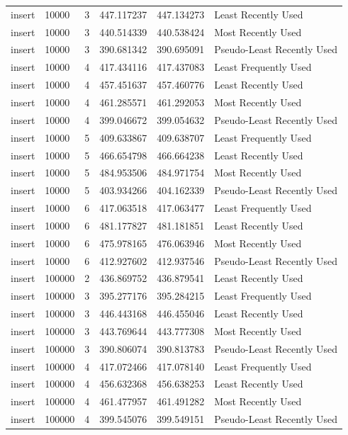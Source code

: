 \begin{tabular}{llrrrl}
insert & 10000 & 3 & 447.117237 & 447.134273 & Least Recently Used \\
insert & 10000 & 3 & 440.514339 & 440.538424 & Most Recently Used \\
insert & 10000 & 3 & 390.681342 & 390.695091 & Pseudo-Least Recently Used \\
insert & 10000 & 4 & 417.434116 & 417.437083 & Least Frequently Used \\
insert & 10000 & 4 & 457.451637 & 457.460776 & Least Recently Used \\
insert & 10000 & 4 & 461.285571 & 461.292053 & Most Recently Used \\
insert & 10000 & 4 & 399.046672 & 399.054632 & Pseudo-Least Recently Used \\
insert & 10000 & 5 & 409.633867 & 409.638707 & Least Frequently Used \\
insert & 10000 & 5 & 466.654798 & 466.664238 & Least Recently Used \\
insert & 10000 & 5 & 484.953506 & 484.971754 & Most Recently Used \\
insert & 10000 & 5 & 403.934266 & 404.162339 & Pseudo-Least Recently Used \\
insert & 10000 & 6 & 417.063518 & 417.063477 & Least Frequently Used \\
insert & 10000 & 6 & 481.177827 & 481.181851 & Least Recently Used \\
insert & 10000 & 6 & 475.978165 & 476.063946 & Most Recently Used \\
insert & 10000 & 6 & 412.927602 & 412.937546 & Pseudo-Least Recently Used \\
insert & 100000 & 2 & 436.869752 & 436.879541 & Least Recently Used \\
insert & 100000 & 3 & 395.277176 & 395.284215 & Least Frequently Used \\
insert & 100000 & 3 & 446.443168 & 446.455046 & Least Recently Used \\
insert & 100000 & 3 & 443.769644 & 443.777308 & Most Recently Used \\
insert & 100000 & 3 & 390.806074 & 390.813783 & Pseudo-Least Recently Used \\
insert & 100000 & 4 & 417.072466 & 417.078140 & Least Frequently Used \\
insert & 100000 & 4 & 456.632368 & 456.638253 & Least Recently Used \\
insert & 100000 & 4 & 461.477957 & 461.491282 & Most Recently Used \\
insert & 100000 & 4 & 399.545076 & 399.549151 & Pseudo-Least Recently Used \\

\end{tabular}
